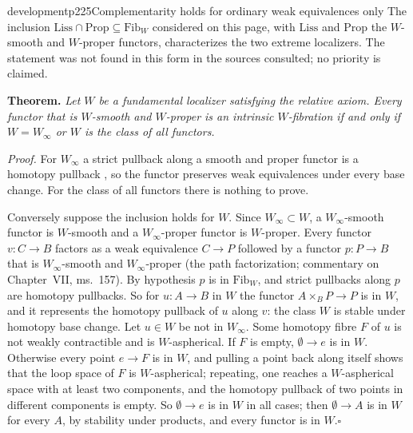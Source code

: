 \begin{dcomment}{development}{p225}{Complementarity holds for ordinary weak equivalences only}
The inclusion $\mathrm{Liss}\cap\mathrm{Prop}\subseteq\mathrm{Fib}_W$ considered on this page, with $\mathrm{Liss}$ and $\mathrm{Prop}$ the $W$-smooth and $W$-proper functors, characterizes the two extreme localizers. The statement was not found in this form in the sources consulted; no priority is claimed.

\textbf{Theorem.}\ours
\textit{Let $W$ be a fundamental localizer satisfying the relative axiom. Every functor that is $W$-smooth and $W$-proper is an intrinsic $W$-fibration if and only if $W=W_\infty$ or $W$ is the class of all functors.}

\textit{Proof.}
For $W_\infty$ a strict pullback along a smooth and proper functor is a homotopy pullback \citep[6.4.8 and 6.4.16]{Cisinski2006}, so the functor preserves weak equivalences under every base change. For the class of all functors there is nothing to prove.

Conversely suppose the inclusion holds for $W$. Since $W_\infty\subset W$, a $W_\infty$-smooth functor is $W$-smooth and a $W_\infty$-proper functor is $W$-proper. Every functor $v:C\to B$ factors as a weak equivalence $C\to P$ followed by a functor $p:P\to B$ that is $W_\infty$-smooth and $W_\infty$-proper (the path factorization; commentary on Chapter~VII, ms.~157). By hypothesis $p$ is in $\mathrm{Fib}_W$, and strict pullbacks along $p$ are homotopy pullbacks. So for $u:A\to B$ in $W$ the functor $A\times_BP\to P$ is in $W$, and it represents the homotopy pullback of $u$ along $v$: the class $W$ is stable under homotopy base change. Let $u\in W$ be not in $W_\infty$. Some homotopy fibre $F$ of $u$ is not weakly contractible and is $W$-aspherical. If $F$ is empty, $\emptyset\to e$ is in $W$. Otherwise every point $e\to F$ is in $W$, and pulling a point back along itself shows that the loop space of $F$ is $W$-aspherical; repeating, one reaches a $W$-aspherical space with at least two components, and the homotopy pullback of two points in different components is empty. So $\emptyset\to e$ is in $W$ in all cases; then $\emptyset\to A$ is in $W$ for every $A$, by stability under products, and every functor is in $W$.\hfill$\square$


\end{dcomment}

